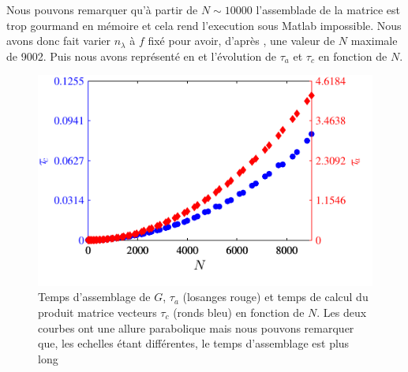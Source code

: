 \documentclass[10pt]{article}
\begin{document}
\begin{multicols}{2}
Nous pouvons remarquer qu'à partir de $N \sim 10 000$ l'assemblade de la matrice est trop gourmand en mémoire et cela rend l'execution sous Matlab impossible. Nous avons donc fait varier $n_\lambda$ à $f$ fixé pour avoir, d'après , une valeur de $N$ maximale de 9002. Puis nous avons représenté en  et  l'évolution de $\tau_a$ et $\tau_c$ en fonction de $N$.



\begin{figure}[H]
  \begin{center}
  \includegraphics[width=0.95\columnwidth]{Q2a_4.pdf}
  \vspace*{-11pt}
  \caption{Temps d'assemblage de $G$, $\tau_a$ (losanges rouge) et temps de calcul du produit matrice vecteurs $\tau_c$ (ronds bleu) en fonction de $N$. Les deux courbes ont une allure parabolique mais nous pouvons remarquer que, les echelles étant différentes, le temps d'assemblage est plus long}
  \label{fig:Q2a}
  \end{center}
\end{figure}
\vspace*{-22pt}


\end{multicols}
\end{document}
